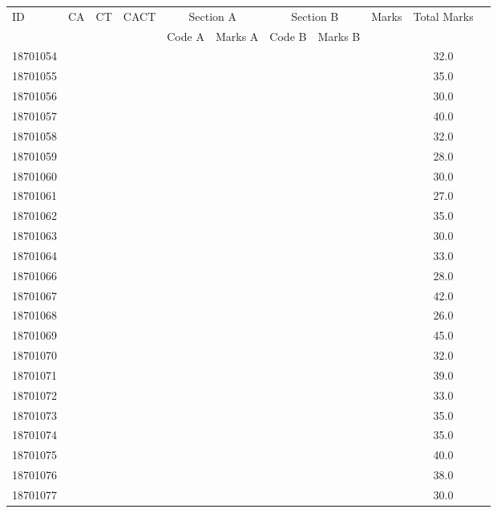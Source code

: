 \documentclass[12pt]{article}
\begin{document}
    \begin{center} 
	\renewcommand{\arraystretch}{1.08}
	\begin{small}
    \begin{tabular}{|l|c|c|c|c|c|c|c|c|c|c|} \hline
	\multirow{2}{*}{ID} & 	\multirow{2}{*}{CA}  & 	\multirow{2}{*}{CT}  & 	\multirow{2}{*}{CACT}  & \multicolumn{2 }{c|}{Section A}& \multicolumn{2 }{c|}{Section B} & 	\multirow{2}{*}{Marks}  & 	\multirow{2}{*}{Total Marks}  \\ 
	&  &  &  & Code A & Marks A & Code B & Marks B&  &  \\ \hline
18701054 &  &  &  &  &  &  &  &  & 32.0\\ \hline 
18701055 &  &  &  &  &  &  &  &  & 35.0\\ \hline 
18701056 &  &  &  &  &  &  &  &  & 30.0\\ \hline 
18701057 &  &  &  &  &  &  &  &  & 40.0\\ \hline 
18701058 &  &  &  &  &  &  &  &  & 32.0\\ \hline 
18701059 &  &  &  &  &  &  &  &  & 28.0\\ \hline 
18701060 &  &  &  &  &  &  &  &  & 30.0\\ \hline 
18701061 &  &  &  &  &  &  &  &  & 27.0\\ \hline 
18701062 &  &  &  &  &  &  &  &  & 35.0\\ \hline 
18701063 &  &  &  &  &  &  &  &  & 30.0\\ \hline 
18701064 &  &  &  &  &  &  &  &  & 33.0\\ \hline 
18701066 &  &  &  &  &  &  &  &  & 28.0\\ \hline 
18701067 &  &  &  &  &  &  &  &  & 42.0\\ \hline 
18701068 &  &  &  &  &  &  &  &  & 26.0\\ \hline 
18701069 &  &  &  &  &  &  &  &  & 45.0\\ \hline 
18701070 &  &  &  &  &  &  &  &  & 32.0\\ \hline 
18701071 &  &  &  &  &  &  &  &  & 39.0\\ \hline 
18701072 &  &  &  &  &  &  &  &  & 33.0\\ \hline 
18701073 &  &  &  &  &  &  &  &  & 35.0\\ \hline 
18701074 &  &  &  &  &  &  &  &  & 35.0\\ \hline 
18701075 &  &  &  &  &  &  &  &  & 40.0\\ \hline 
18701076 &  &  &  &  &  &  &  &  & 38.0\\ \hline 
18701077 &  &  &  &  &  &  &  &  & 30.0\\ \hline 
        \end{tabular}
            \end{small}
            \end{center}
  \centering
            
\end{document}

